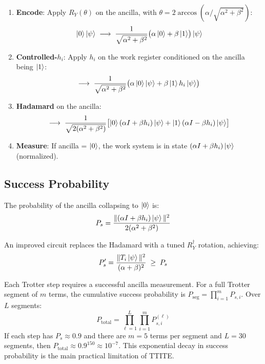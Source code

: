 \documentclass[11pt,a4paper]{article}
\begin{document}
\begin{enumerate}[nosep]
  \item \textbf{Encode}: Apply $R_Y(\theta)$ on the ancilla, with
    $\theta = 2\arccos(\alpha/\sqrt{\alpha^2+\beta^2})$:
    \begin{equation}
      \ket{0}\ket{\psi} \;\longrightarrow\;
      \frac{1}{\sqrt{\alpha^2+\beta^2}}
      \bigl(\alpha\ket{0} + \beta\ket{1}\bigr)\ket{\psi}
    \end{equation}

  \item \textbf{Controlled-$h_i$}: Apply $h_i$ on the work register
    conditioned on the ancilla being $\ket{1}$:
    \begin{equation}
      \longrightarrow\;
      \frac{1}{\sqrt{\alpha^2+\beta^2}}
      \bigl(\alpha\ket{0}\ket{\psi} + \beta\ket{1}h_i\ket{\psi}\bigr)
    \end{equation}

  \item \textbf{Hadamard} on the ancilla:
    \begin{equation}
      \longrightarrow\;
      \frac{1}{\sqrt{2(\alpha^2+\beta^2)}}
      \bigl[\ket{0}(\alpha I + \beta h_i)\ket{\psi}
      + \ket{1}(\alpha I - \beta h_i)\ket{\psi}\bigr]
    \end{equation}

  \item \textbf{Measure}: If ancilla = $\ket{0}$, the work system is in
    state $(\alpha I + \beta h_i)\ket{\psi}$ (normalized).
\end{enumerate}

\subsection{Success Probability}

The probability of the ancilla collapsing to $\ket{0}$ is:
\begin{equation}
  P_s = \frac{\|(\alpha I + \beta h_i)\ket{\psi}\|^2}{2(\alpha^2+\beta^2)}
  \label{eq:success_prob}
\end{equation}

An improved circuit replaces the Hadamard with a tuned $R_Y^\dagger$ rotation, achieving:
\begin{equation}
  P'_s = \frac{\|T_i\ket{\psi}\|^2}{(\alpha+\beta)^2} \;\geq\; P_s
  \label{eq:improved_prob}
\end{equation}

\begin{keybox}
Each Trotter step requires a successful ancilla measurement.
For a full Trotter segment of $m$ terms, the cumulative success probability
is $P_{\text{seg}} = \prod_{i=1}^m P_{s,i}$.  Over $L$ segments:
\begin{equation}
  P_{\text{total}} = \prod_{\ell=1}^{L}\prod_{i=1}^{m} P_{s,i}^{(\ell)}
\end{equation}
If each step has $P_s \approx 0.9$ and there are $m=5$ terms per
segment and $L=30$ segments, then $P_{\text{total}} \approx 0.9^{150}
\approx 10^{-7}$.  This exponential decay in success probability is the
main practical limitation of TTITE.
\end{keybox}
\end{document}
